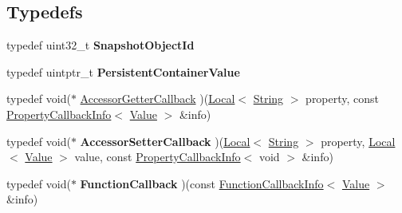 \subsection*{Typedefs}
\begin{DoxyCompactItemize}
\item 
\hypertarget{namespacev8_acc05be0fdcf26b26fbb410e75a048e63}{typedef uint32\-\_\-t {\bfseries Snapshot\-Object\-Id}}\label{namespacev8_acc05be0fdcf26b26fbb410e75a048e63}

\item 
\hypertarget{namespacev8_af40bc0395e06dd22c3bb1328deb94869}{typedef uintptr\-\_\-t {\bfseries Persistent\-Container\-Value}}\label{namespacev8_af40bc0395e06dd22c3bb1328deb94869}

\item 
typedef void($\ast$ \hyperlink{namespacev8_a2676a71943fdebd2e0a09fc256de6ff9}{Accessor\-Getter\-Callback} )(\hyperlink{classv8_1_1Local}{Local}$<$ \hyperlink{classv8_1_1String}{String} $>$ property, const \hyperlink{classv8_1_1PropertyCallbackInfo}{Property\-Callback\-Info}$<$ \hyperlink{classv8_1_1Value}{Value} $>$ \&info)
\item 
\hypertarget{namespacev8_a3c716a6c06f30870cf428ff4ab63a418}{typedef void($\ast$ {\bfseries Accessor\-Setter\-Callback} )(\hyperlink{classv8_1_1Local}{Local}$<$ \hyperlink{classv8_1_1String}{String} $>$ property, \hyperlink{classv8_1_1Local}{Local}$<$ \hyperlink{classv8_1_1Value}{Value} $>$ value, const \hyperlink{classv8_1_1PropertyCallbackInfo}{Property\-Callback\-Info}$<$ void $>$ \&info)}\label{namespacev8_a3c716a6c06f30870cf428ff4ab63a418}

\item 
\hypertarget{namespacev8_acb71edb30dc5e214976265b1bd730aba}{typedef void($\ast$ {\bfseries Function\-Callback} )(const \hyperlink{classv8_1_1FunctionCallbackInfo}{Function\-Callback\-Info}$<$ \hyperlink{classv8_1_1Value}{Value} $>$ \&info)}\label{namespacev8_acb71edb30dc5e214976265b1bd730aba}


\end{DoxyCompactItemize}
